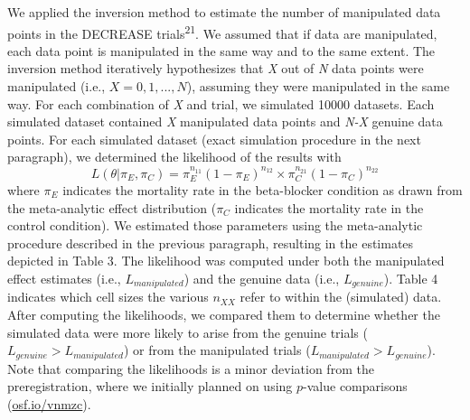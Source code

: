 \documentclass[]{article}
\begin{document}
We applied the inversion method to estimate the number of manipulated
data points in the DECREASE trials\textsuperscript{21}. We assumed that
if data are manipulated, each data point is manipulated in the same way
and to the same extent. The inversion method iteratively hypothesizes
that \emph{X} out of \emph{N} data points were manipulated (i.e.,
\(X={0, 1, ..., N}\)), assuming they were manipulated in the same way.
For each combination of \emph{X} and trial, we simulated 10000 datasets.
Each simulated dataset contained \emph{X} manipulated data points and
\emph{N-X} genuine data points. For each simulated dataset (exact
simulation procedure in the next paragraph), we determined the
likelihood of the results with \[
L(\theta|\pi_{E},\pi_{C})=\pi_{E}^{n_{11}}(1-\pi_{E})^{n_{12}} \times \pi_{C}^{n_{21}}(1 - \pi_{C})^{n_{22}}
\] where \(\pi_{E}\) indicates the mortality rate in the beta-blocker
condition as drawn from the meta-analytic effect distribution
(\(\pi_{C}\) indicates the mortality rate in the control condition). We
estimated those parameters using the meta-analytic procedure described
in the previous paragraph, resulting in the estimates depicted in Table
3. The likelihood was computed under both the manipulated effect
estimates (i.e., \(L_{manipulated}\)) and the genuine data (i.e.,
\(L_{genuine}\)). Table 4 indicates which cell sizes the various
\(n_{XX}\) refer to within the (simulated) data. After computing the
likelihoods, we compared them to determine whether the simulated data
were more likely to arise from the genuine trials
(\(L_{genuine}>L_{manipulated}\)) or from the manipulated trials
(\(L_{manipulated}>L_{genuine}\)). Note that comparing the likelihoods
is a minor deviation from the preregistration, where we initially
planned on using \(p\)-value comparisons
(\href{https://osf.io/vnmzc}{osf.io/vnmzc}).
\end{document}
